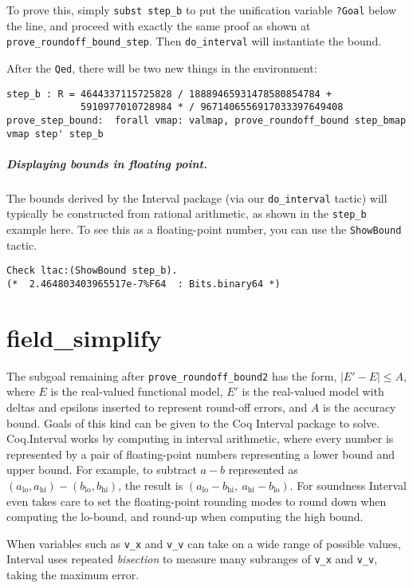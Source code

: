 \documentclass[article]{memoir}
\begin{document}
To prove this, simply \lstinline{subst step_b} to put the
unification variable \lstinline{?Goal} below the line,
and proceed with exactly the same proof as
shown at \lstinline{prove_roundoff_bound_step}.
Then \lstinline{do_interval} will instantiate the bound.

After the \lstinline{Qed}, there will be two new things
in the environment:
\begin{lstlisting}
step_b : R = 4644337115725828 / 18889465931478580854784 +
             5910977010728984 * / 9671406556917033397649408
prove_step_bound:  forall vmap: valmap, prove_roundoff_bound step_bmap vmap step' step_b
\end{lstlisting}

\paragraph{Displaying bounds in floating point.}
The bounds derived by the Interval package (via our \lstinline{do_interval}
tactic) will typically be constructed from rational arithmetic,
as shown in the \lstinline{step_b} example here.
To see this as a floating-point number, you can use the \lstinline{ShowBound} tactic.
\begin{lstlisting}
Check ltac:(ShowBound step_b).
(*  2.464803403965517e-7%F64  : Bits.binary64 *)
\end{lstlisting}


\chapter{field\_simplify}

The subgoal remaining after \lstinline{prove_roundoff_bound2} has the
form, $|E'-E|\le A$, where $E$ is the real-valued functional model,
$E'$ is the real-valued model with deltas and epsilons inserted to
represent round-off errors, and $A$ is the accuracy bound.
Goals of this kind can be given to the Coq Interval package to solve.
Coq.Interval works by computing in interval arithmetic,
where every number is represented by a pair of floating-point numbers
representing a lower bound and upper bound.  For example, to subtract
$a-b$ represented as $(a_\mathrm{lo},a_\mathrm{hi})-(b_\mathrm{lo},b_\mathrm{hi})$,
the result is $(a_\mathrm{lo}-b_\mathrm{hi},~a_\mathrm{hi}-b_\mathrm{lo})$.
For soundness Interval even takes care to set the floating-point rounding modes
to round down when computing the lo-bound, and round-up when computing
the high bound.

When variables such as \lstinline{v_x} and \lstinline{v_v} can
take on a wide range of possible values, Interval uses
repeated \emph{bisection} to measure many subranges
of \lstinline{v_x} and \lstinline{v_v}, taking the maximum error.
\end{document}
